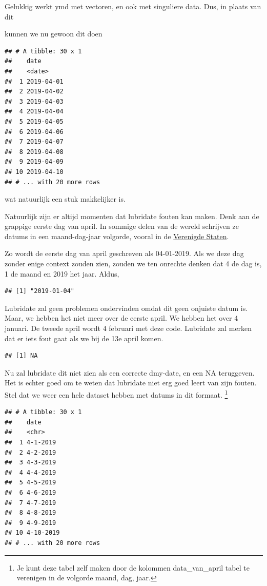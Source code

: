 \documentclass[]{tufte-book}
\begin{document}
Gelukkig werkt ymd met vectoren, en ook met singuliere data. Dus, in plaats van dit

kunnen we nu gewoon dit doen

\begin{verbatim}
## # A tibble: 30 x 1
##    date      
##    <date>    
##  1 2019-04-01
##  2 2019-04-02
##  3 2019-04-03
##  4 2019-04-04
##  5 2019-04-05
##  6 2019-04-06
##  7 2019-04-07
##  8 2019-04-08
##  9 2019-04-09
## 10 2019-04-10
## # ... with 20 more rows
\end{verbatim}

wat natuurlijk een stuk makkelijker is.

Natuurlijk zijn er altijd momenten dat lubridate fouten kan maken. Denk aan de grappige eerste dag van april. In sommige delen van de wereld schrijven ze datums in een maand-dag-jaar volgorde, vooral in de \href{https://en.wikipedia.org/wiki/Date_and_time_notation_in_the_United_States}{Verenigde Staten}.

Zo wordt de eerste dag van april geschreven als 04-01-2019. Als we deze dag zonder enige context zouden zien, zouden we ten onrechte denken dat 4 de dag is, 1 de maand en 2019 het jaar. Aldus,

\begin{verbatim}
## [1] "2019-01-04"
\end{verbatim}

Lubridate zal geen problemen ondervinden omdat dit geen onjuiste datum is. Maar, we hebben het niet meer over de eerste april. We hebben het over 4 januari. De tweede april wordt 4 februari met deze code. Lubridate zal merken dat er iets fout gaat als we bij de 13e april komen.

\begin{verbatim}
## [1] NA
\end{verbatim}

Nu zal lubridate dit niet zien als een correcte dmy-date, en een NA teruggeven. Het is echter goed om te weten dat lubridate niet erg goed leert van zijn fouten. Stel dat we weer een hele dataset hebben met datums in dit formaat. \footnote{Je kunt deze tabel zelf maken door de kolommen data\_van\_april tabel te verenigen in de volgorde maand, dag, jaar.}

\begin{verbatim}
## # A tibble: 30 x 1
##    date     
##    <chr>    
##  1 4-1-2019 
##  2 4-2-2019 
##  3 4-3-2019 
##  4 4-4-2019 
##  5 4-5-2019 
##  6 4-6-2019 
##  7 4-7-2019 
##  8 4-8-2019 
##  9 4-9-2019 
## 10 4-10-2019
## # ... with 20 more rows
\end{verbatim}
\end{document}
